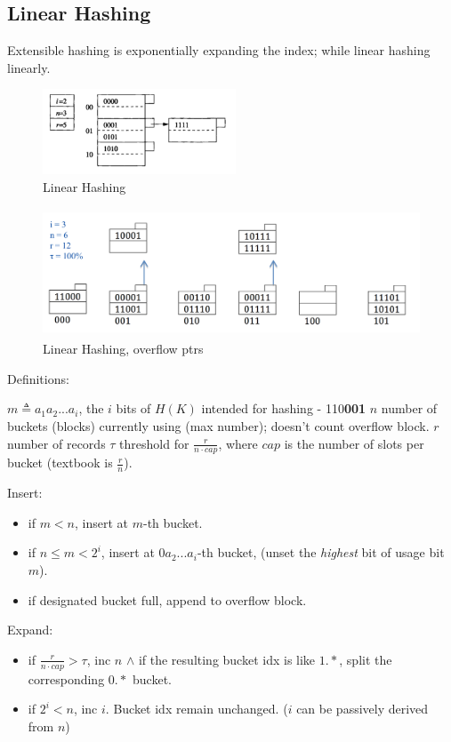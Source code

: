 \documentclass[a4paper]{report}
\begin{document}
\subsection{Linear Hashing}
Extensible hashing is exponentially expanding the index; while linear hashing  linearly.
\begin{figure}[H]
    \centerline{\includegraphics[height = 1in]{img/linearhashing}}
    \caption{Linear Hashing}
  \label{fig:linearHashing}
\end{figure}
\begin{figure}[H]
    \centerline{\includegraphics[height = 1.5in]{img/linearHahsing2}}
    \caption{Linear Hashing, overflow ptrs}
  \label{fig:linearHashing2}
\end{figure}
Definitions:
\begin{itemize}
\treeitem $m \triangleq a_1a_2...a_i$, the $i$  bits of $H(K)$ intended for hashing - 110\textbf{001}
\treeitem $n$ number of buckets (blocks) currently using (max number); doesn't count overflow block.
\treeitem $r$ number of records
\treeitem $\tau$ threshold for $\frac{r}{n\cdot cap}$, where $cap$ is the number of slots per bucket (textbook is $\frac{r}{n}$).
\end{itemize}
Insert:
\begin{itemize}
\item if $m<n$, insert at $m$-th bucket.
\item if $n\leq m < 2^i$, insert at $0a_2...a_i$-th bucket, (unset the \textit{highest} bit of usage bit $m$).
\item if designated bucket full, append to overflow block.
\end{itemize}
Expand:
\begin{itemize}
\item if $\frac{r}{n\cdot cap}>\tau$, inc $n$ $\wedge$ if the resulting bucket idx is like $1.*$, split the corresponding $0.*$ bucket.
\item if $2^i<n$, inc $i$. Bucket idx remain unchanged. ($i$ can be passively derived from $n$)
\end{itemize}
\end{document}

